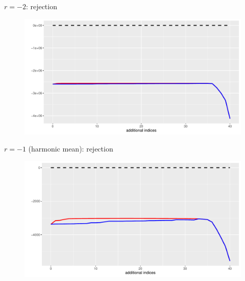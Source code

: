 \documentclass[aspectratio=169]{beamer}
\begin{document}

\begin{frame}{$r=-2$: rejection}
\begin{figure}
\centering
\includegraphics[scale=0.6]{plot2n.pdf}
\end{figure}
\end{frame}





\begin{frame}{$r=-1$ (harmonic mean): rejection}
\begin{figure}
\centering
\includegraphics[scale=0.6]{plot1n.pdf}
\end{figure}
\end{frame}

\end{document}
